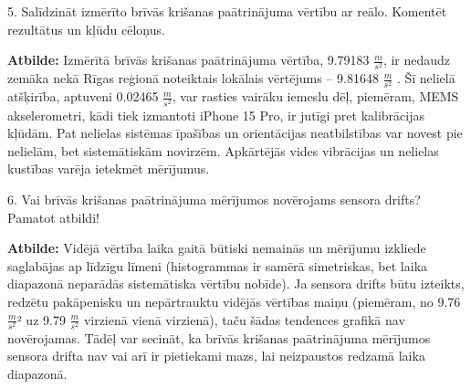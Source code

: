 \documentclass[12pt]{article}
\newlength\tindent
\renewcommand{\indent}{\hspace*{\tindent}}
\begin{document}
5.	Salīdzināt izmērīto brīvās krišanas paātrinājuma vērtību ar reālo. Komentēt rezultātus un kļūdu cēloņus.

\indent \textbf{Atbilde:} Izmērītā brīvās krišanas paātrinājuma vērtība, 9.79183 $\frac{m}{s^2}$, ir nedaudz zemāka nekā Rīgas reģionā noteiktais lokālais vērtējums – 9.81648 $\frac{m}{s^2}$ \cite{aleksejenko2012}. Šī nelielā atšķirība, aptuveni 0.02465 $\frac{m}{s^2}$, var rasties vairāku iemeslu dēļ, piemēram, MEMS akselerometri, kādi tiek izmantoti iPhone 15 Pro, ir jutīgi pret kalibrācijas kļūdām. Pat nelielas sistēmas īpašības un orientācijas neatbilstības var novest pie nelielām, bet sistemātiskām novirzēm. Apkārtējās vides vibrācijas un nelielas kustības varēja ietekmēt mērījumus.

6.	Vai brīvās krišanas paātrinājuma mērījumos novērojams sensora drifts? Pamatot atbildi!

\indent \textbf{Atbilde:} Vidējā vērtība laika gaitā būtiski nemainās un mērījumu izkliede saglabājas ap līdzīgu līmeni (histogrammas ir samērā simetriskas, bet laika diapazonā neparādās sistemātiska vērtību nobīde). Ja sensora drifts būtu izteikts, redzētu pakāpenisku un nepārtrauktu vidējās vērtības maiņu (piemēram, no 9.76 $\frac{m}{s^2}$² uz 9.79 $\frac{m}{s^2}$ virzienā vienā virzienā), taču šādas tendences grafikā nav novērojamas. Tādēļ var secināt, ka brīvās krišanas paātrinājuma mērījumos sensora drifta nav vai arī ir pietiekami mazs, lai neizpaustos redzamā laika diapazonā.
\end{document}
